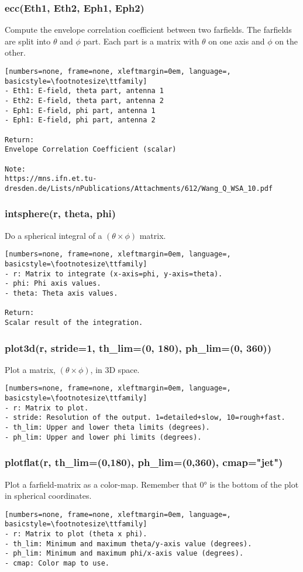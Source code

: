 \subsubsection{ecc(Eth1, Eth2, Eph1, Eph2)}
Compute the envelope correlation coefficient between two farfields. The
farfields are split into $\theta$ and $\phi$ part. Each part is a matrix with
$\theta$ on one axis and $\phi$ on the other.

\begin{lstlisting}[numbers=none, frame=none, xleftmargin=0em, language=, basicstyle=\footnotesize\ttfamily]
- Eth1: E-field, theta part, antenna 1
- Eth2: E-field, theta part, antenna 2
- Eph1: E-field, phi part, antenna 1
- Eph1: E-field, phi part, antenna 2

Return:
Envelope Correlation Coefficient (scalar)

Note:
https://mns.ifn.et.tu-dresden.de/Lists/nPublications/Attachments/612/Wang_Q_WSA_10.pdf
\end{lstlisting}

\subsubsection{intsphere(r, theta, phi)}
Do a spherical integral of a $(\theta \times \phi)$ matrix.

\begin{lstlisting}[numbers=none, frame=none, xleftmargin=0em, language=, basicstyle=\footnotesize\ttfamily]
- r: Matrix to integrate (x-axis=phi, y-axis=theta).
- phi: Phi axis values.
- theta: Theta axis values.

Return:
Scalar result of the integration.
\end{lstlisting}

\subsubsection{plot3d(r, stride=1, th\_lim=(0, 180), ph\_lim=(0, 360))}
Plot a matrix, $(\theta \times \phi)$, in 3D space.

\begin{lstlisting}[numbers=none, frame=none, xleftmargin=0em, language=, basicstyle=\footnotesize\ttfamily]
- r: Matrix to plot.
- stride: Resolution of the output. 1=detailed+slow, 10=rough+fast.
- th_lim: Upper and lower theta limits (degrees).
- ph_lim: Upper and lower phi limits (degrees).
\end{lstlisting}

\subsubsection{plotflat(r, th\_lim=(0,180), ph\_lim=(0,360), cmap="jet")}
Plot a farfield-matrix as a color-map. Remember that \ang{0} is the bottom of
the plot in spherical coordinates.

\begin{lstlisting}[numbers=none, frame=none, xleftmargin=0em, language=, basicstyle=\footnotesize\ttfamily]
- r: Matrix to plot (theta x phi).
- th_lim: Minimum and maximum theta/y-axis value (degrees).
- ph_lim: Minimum and maximum phi/x-axis value (degrees).
- cmap: Color map to use.
\end{lstlisting}

